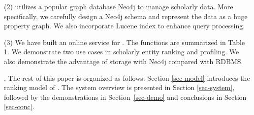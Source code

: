 \noindent (2) \oursystem utilizes a popular graph database Neo4j to manage scholarly data. More specifically, we carefully design a Neo4j schema and represent the data as a huge property graph. We also incorporate Lucene index to enhance query processing.


\noindent (3) We have built an online service for \oursystem. The functions are summarized in Table 1. We demonstrate two use cases in scholarly entity ranking and profiling. We also demonstrate the advantage of storage with Neo4j compared with RDBMS.



.
The rest of this paper is organized as follows. Section \ref{sec-model} introduces the ranking model of \oursystem. The system overview is presented in Section \ref{sec-system}, followed by the demonstrations in Section~\ref{sec-demo} and conclusions in Section \ref{sec-conc}.
